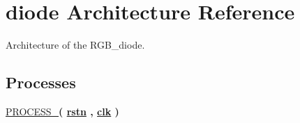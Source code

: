 \hypertarget{classRGB__diode__controller_1_1diode}{\section{diode Architecture Reference}
\label{classRGB__diode__controller_1_1diode}
}


Architecture of the R\-G\-B\-\_\-diode.  


\subsection*{Processes}
 \begin{DoxyCompactItemize}
\item 
\hypertarget{classRGB__diode__controller_1_1diode_a9e039d1336ed36e47c247368cdc9b80b}{\hyperlink{classRGB__diode__controller_1_1diode_a9e039d1336ed36e47c247368cdc9b80b}{P\-R\-O\-C\-E\-S\-S\-\_}{\bfseries  ( {\bfseries {\bfseries \hyperlink{classRGB__diode__controller_aba021aec4b477b89079bb58ccadcc67e}{rstn}} \textcolor{vhdlchar}{ }\textcolor{vhdlchar}{ }\textcolor{vhdlchar}{ }} , {\bfseries {\bfseries \hyperlink{classRGB__diode__controller_a8120037e0ee47c35ba2d79242209c72e}{clk}} \textcolor{vhdlchar}{ }} )}}\label{classRGB__diode__controller_1_1diode_a9e039d1336ed36e47c247368cdc9b80b}

\end{DoxyCompactItemize}
